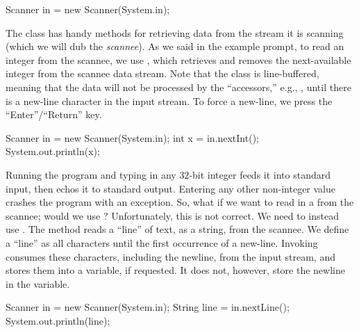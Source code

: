 \begin{verbnobox}[\small]
Scanner in = new Scanner(System.in);
\end{verbnobox}

The  class has handy methods for retrieving data from the stream it is scanning (which we will dub the \textit{scannee}). As we said in the example prompt, to read an integer from the scannee, we use , which retrieves and removes the next-available integer from the scannee data stream. Note that the  class is line-buffered, meaning that the data will not be processed by the ``accessors,'' e.g., , until there is a new-line character in the input stream. To force a new-line, we press the ``Enter''/``Return'' key.

\begin{verbnobox}[\small]
Scanner in = new Scanner(System.in);
int x = in.nextInt();
System.out.println(x);
\end{verbnobox}

Running the program and typing in any $32$-bit integer feeds it into standard input, then echos it to standard output. Entering any other non-integer value crashes the program with an  exception. So, what if we want to read in a  from the scannee; would we use ? Unfortunately, this is not correct. We need to instead use . The  method reads a ``line'' of text, as a string, from the scannee. We define a ``line'' as all characters until the first occurrence of a new-line. Invoking  consumes these characters, including the newline, from the input stream, and stores them into a variable, if requested. It does not, however, store the newline in the variable. 

\begin{verbnobox}[\small]
Scanner in = new Scanner(System.in);
String line = in.nextLine();
System.out.println(line);
\end{verbnobox}


